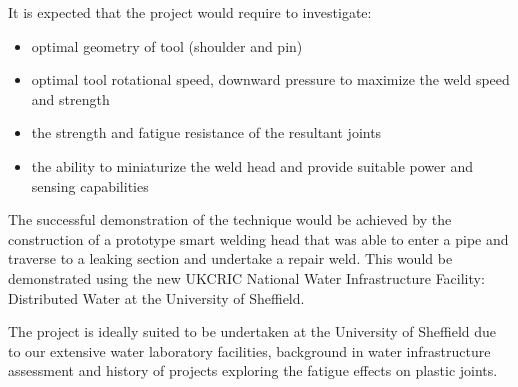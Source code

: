 \documentclass[	DIV=calc,%
							paper=a4,%
							fontsize=11pt,%
							twocolumn]{scrartcl}	 					%
\begin{document}
It is expected that the project would require to investigate:
\begin{itemize}
 \item optimal geometry of tool (shoulder and pin)
 \item optimal tool rotational speed, downward pressure to maximize the weld 
speed and strength
\item the strength and fatigue resistance of the resultant joints
\item the ability to miniaturize the weld head and provide suitable power and 
sensing capabilities
\end{itemize}

The successful demonstration of the technique would be achieved by the 
construction of a prototype smart welding head that was able to enter a pipe 
and traverse to a leaking section and undertake a repair weld.  This would be 
demonstrated using the new UKCRIC National Water Infrastructure
Facility: Distributed Water at the University of Sheffield.

The project is ideally suited to be undertaken at the University of Sheffield 
due to our extensive water laboratory facilities, background in water 
infrastructure assessment and history of projects exploring the fatigue effects 
on plastic joints.


{\footnotesize
}
\end{document}

